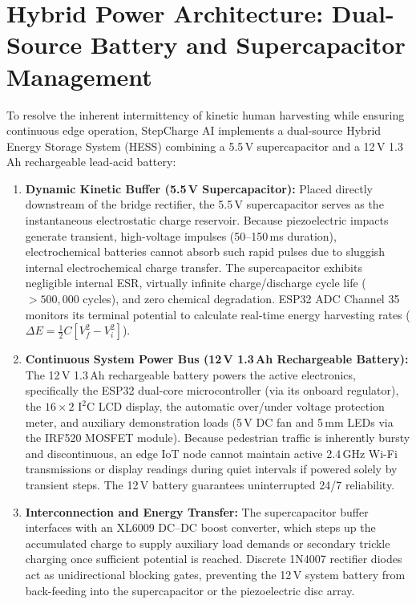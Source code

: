 \section{Hybrid Power Architecture: Dual-Source Battery and Supercapacitor Management}
To resolve the inherent intermittency of kinetic human harvesting while ensuring continuous edge operation, StepCharge AI implements a dual-source Hybrid Energy Storage System (HESS) combining a 5.5\,V supercapacitor and a 12\,V 1.3\,Ah rechargeable lead-acid battery:
\begin{enumerate}[itemsep=2pt,parsep=1pt,topsep=3pt]
    \item \textbf{Dynamic Kinetic Buffer (5.5\,V Supercapacitor):} Placed directly downstream of the bridge rectifier, the 5.5\,V supercapacitor serves as the instantaneous electrostatic charge reservoir. Because piezoelectric impacts generate transient, high-voltage impulses (50--150\,ms duration), electrochemical batteries cannot absorb such rapid pulses due to sluggish internal electrochemical charge transfer. The supercapacitor exhibits negligible internal ESR, virtually infinite charge/discharge cycle life ($>500,000$ cycles), and zero chemical degradation. ESP32 ADC Channel 35 monitors its terminal potential to calculate real-time energy harvesting rates ($\Delta E = \frac{1}{2} C [V_f^2 - V_i^2]$).
    \item \textbf{Continuous System Power Bus (12\,V 1.3\,Ah Rechargeable Battery):} The 12\,V 1.3\,Ah rechargeable battery powers the active electronics, specifically the ESP32 dual-core microcontroller (via its onboard regulator), the $16\times 2$ $\text{I}^2\text{C}$ LCD display, the automatic over/under voltage protection meter, and auxiliary demonstration loads (5\,V DC fan and 5\,mm LEDs via the IRF520 MOSFET module). Because pedestrian traffic is inherently bursty and discontinuous, an edge IoT node cannot maintain active 2.4\,GHz Wi-Fi transmissions or display readings during quiet intervals if powered solely by transient steps. The 12\,V battery guarantees uninterrupted 24/7 reliability.
    \item \textbf{Interconnection and Energy Transfer:} The supercapacitor buffer interfaces with an XL6009 DC--DC boost converter, which steps up the accumulated charge to supply auxiliary load demands or secondary trickle charging once sufficient potential is reached. Discrete 1N4007 rectifier diodes act as unidirectional blocking gates, preventing the 12\,V system battery from back-feeding into the supercapacitor or the piezoelectric disc array.
\end{enumerate}

